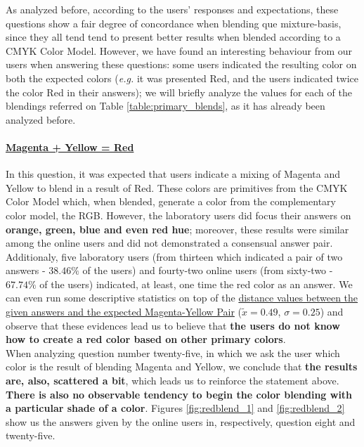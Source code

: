 %
As analyzed before, according to the users' responses and expectations, these questions show a fair degree of concordance when blending que mixture-basis, since they all tend tend to present better results when
blended according to a CMYK Color Model. However, we have found an interesting behaviour from our users when answering these questions: some users indicated the resulting color on both the expected colors (\emph{e.g.}
it was presented Red, and the users indicated twice the color Red in their answers); we will briefly analyze the values for each of the blendings referred on Table \ref{table:primary_blends}, as it has already been
analyzed before.
%
\paragraph{\ul{Magenta + Yellow = Red}}
%
In this question, it was expected that users indicate a mixing of Magenta and Yellow to blend in a result of Red. These colors are primitives from the CMYK Color Model which, when blended, generate a color from the
complementary color model, the RGB. However, the laboratory users did focus their answers on \textbf{orange, green, blue and even red hue}; moreover, these results were similar among the online users and did not
demonstrated a consensual answer pair. \\
%
Additionaly, five laboratory users (from thirteen which indicated a pair of two answers - $38.46\%$ of the users) and fourty-two online users (from sixty-two - $67.74\%$ of the users) indicated, at least, one time the
red color as an answer. We can even run some descriptive statistics on top of the \ul{distance values between the given answers and the expected Magenta-Yellow Pair} ($\tilde{x} = 0.49$, $\sigma = 0.25$) and observe that
these evidences lead us to believe that \textbf{the users do not know how to create a red color based on other primary colors}. \\
%
When analyzing question number twenty-five, in which we ask the user which color is the result of blending Magenta and Yellow, we conclude that \textbf{the results are, also,
scattered a bit}, which leads us to reinforce the statement above. \textbf{There is also no observable tendency to begin the color blending with a particular shade of a color}. Figures \ref{fig:redblend_1} and
\ref{fig:redblend_2} show us the answers given by the online users in, respectively, question eight and twenty-five.
%
